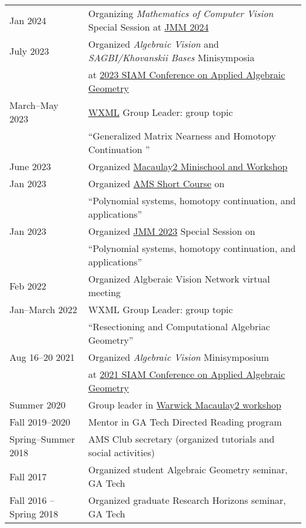 \documentclass[margin,line,pifont,palatino,courier]{res}
\begin{document}
\begin{resume}
\begin{tabular}{@{}p{1.4in}p{5.5in}}
  Jan 2024 & Organizing \emph{Mathematics of Computer Vision} Special Session at \hyperlink{https://www.jointmathematicsmeetings.org//jmm}{JMM 2024} \\
  July 2023 & Organized \emph{Algebraic Vision} and \emph{SAGBI/Khovanskii Bases} Minisymposia\\
  &at \hyperlink{https://www.siam.org/conferences/cm/conference/ag23}{2023 SIAM Conference on Applied Algebraic Geometry}\\
  March--May 2023 &
                    \hyperlink{https://wxml.math.washington.edu/}{WXML}
                    Group Leader: group topic \\
&``Generalized Matrix Nearness and Homotopy Continuation
''\\
  June 2023 & Organized \hyperlink{https://macaulay2.github.io/Workshop-2023-Minneapolis/}{Macaulay2 Minischool and Workshop}\\
  Jan 2023 & Organized \hyperlink{https://www.jointmathematicsmeetings.org//meetings/national/jmm2023/2270_shortcourse}{AMS Short Course} on \\& \indent ``Polynomial systems, homotopy continuation, and applications''\\
  Jan 2023 & Organized \hyperlink{https://www.jointmathematicsmeetings.org/meetings/national/jmm2023/2270_program.html}{JMM 2023} Special Session on \\&\indent ``Polynomial systems, homotopy continuation, and applications''\\
  Feb 2022 &  Organized Algberaic Vision Network virtual meeting\\
  Jan--March 2022 & WXML Group Leader: group topic \\
  & ``Resectioning and Computational Algebriac Geometry''\\
  Aug 16--20 2021& Organized \emph{Algebraic Vision} Minisymposium \\
  &at \hyperlink{https://www.siam.org/conferences/cm/conference/ag21}{2021 SIAM Conference on Applied Algebraic Geometry}\\
  Summer 2020 & Group leader in \hyperlink{https://warwick.ac.uk/fac/sci/maths/research/events/2019-20/m2/}{Warwick Macaulay2 workshop}\\
  Fall 2019--2020 & Mentor in GA Tech Directed Reading program\\
  Spring--Summer 2018 & AMS Club secretary (organized tutorials and social activities)\\
  Fall 2017                & Organized student Algebraic Geometry seminar, GA Tech\\
  Fall 2016 -- Spring 2018 & Organized graduate Research Horizons seminar, GA Tech
\end{tabular}  




\end{resume}
\end{document}
